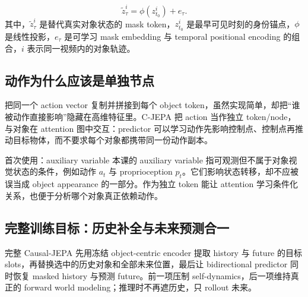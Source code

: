 

\[
\tilde z_\tau^i=\phi(z_{t_0}^i)+e_\tau.
\]
其中，$\tilde z_\tau^i$ 是替代真实对象状态的 mask token，$z_{t_0}^i$ 是最早可见时刻的身份锚点，$\phi$ 是线性投影，$e_\tau$ 是可学习 mask embedding 与 temporal positional encoding 的组合，$i$ 表示同一视频内的对象轨迹。


\subsection{动作为什么应该是单独节点}

把同一个 action vector 复制并拼接到每个 object token，虽然实现简单，却把``谁被动作直接影响''隐藏在高维特征里。C-JEPA 把 action 当作独立 token/node，与对象在 attention 图中交互：predictor 可以学习动作先影响控制点、控制点再推动目标物体，而不要求每个对象都携带同一份动作副本。



\begin{knowledgebox}{首次使用：auxiliary variable}
本课的 auxiliary variable 指可观测但不属于对象视觉状态的条件，例如动作 $a_t$ 与 proprioception $p_t$。它们影响状态转移，却不应被误当成 object appearance 的一部分。作为独立 token 能让 attention 学习条件化关系，也便于分析哪个对象真正依赖动作。
\end{knowledgebox}

\subsection{完整训练目标：历史补全与未来预测合一}

完整 Causal-JEPA 先用冻结 object-centric encoder 提取 history 与 future 的目标 slots，再替换选中的历史对象和全部未来位置，最后让 bidirectional predictor 同时恢复 masked history 与预测 future。前一项压制 self-dynamics，后一项维持真正的 forward world modeling；推理时不再遮历史，只 rollout 未来。

